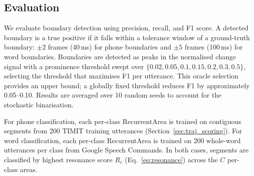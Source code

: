 \subsection{Evaluation}\label{sec:eval}

We evaluate boundary detection using precision, recall, and F1 score. A detected boundary is a true positive if it falls within a tolerance window of a ground-truth boundary: $\pm 2$ frames (40\,ms) for phone boundaries and $\pm 5$ frames (100\,ms) for word boundaries. Boundaries are detected as peaks in the normalised change signal %
with a prominence threshold swept over $\{0.02, 0.05, 0.1, 0.15, 0.2, 0.3, 0.5\}$, selecting the threshold that maximises F1 per utterance. This oracle selection provides an upper bound; a globally fixed threshold reduces F1 by approximately 0.05--0.10. Results are averaged over 10 random seeds to account for the stochastic binarisation.

For phone classification, each per-class RecurrentArea is trained on contiguous segments from 200 TIMIT training utterances (Section~\ref{sec:traj_scoring}). For word classification, each per-class RecurrentArea is trained on 200 whole-word utterances per class from Google Speech Commands. In both cases, segments are classified by highest resonance score $R_c$ (Eq.~\eqref{eq:resonance}) across the $C$ per-class areas.
